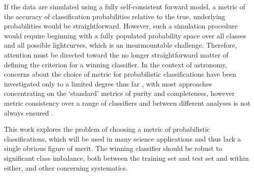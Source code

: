 If the data are simulated using a fully self-consistent forward model, a metric of the accuracy of classification probabilities relative to the true, underlying probabilities would be straightforward.
However, such a simulation procedure would require beginning with a fully populated probability space over all classes and all possible lightcurves, which is an insurmountable challenge.
Therefore, attention must be directed toward the no longer straightforward matter of defining the criterion for a winning classifier.
In the context of astronomy, concerns about the choice of metric for probabilistic classifications have been investigated only to a limited degree thus far \citep{2018SoPh..293...28F, 2017MNRAS.464.4463K}
, with most approaches concentrating on the `standard' metrics of purity and completeness, however metric consistency over a range of classifiers and between different analyses is not always ensured \citep{2018A&C....23...15B}.

This work explores the problem of choosing a metric of probabilistic classifications, which will be used in many science applications and thus lack a single obvious figure of merit.
The winning classifier should be robust to significant class imbalance, both between the training set and test set and within either, and other concerning systematics.

